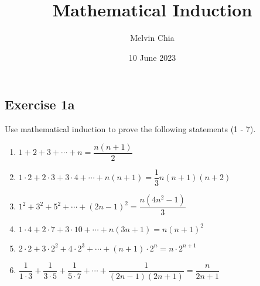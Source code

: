 \documentclass{report}
\title{\Huge{\textbf{Mathematical Induction}}}
\author{Melvin Chia}
\date{10 June 2023}
\begin{document}
\onehalfspacing

\subsection*{Exercise 1a}
Use mathematical induction to prove the following statements (1 - 7).
\begin{enumerate}
    \item $1 + 2 + 3 + \cdots + n = \dfrac{n(n + 1)}{2}$
          \vfill
    \item $1 \cdot 2 + 2 \cdot 3 + 3 \cdot 4 + \cdots + n(n + 1) = \dfrac{1}{3}n(n + 1)(n + 2)$
          \vfill
          \newpage

    \item $1^2 + 3^2 + 5^2 + \cdots + (2n - 1)^2 = \dfrac{n(4n^2 - 1)}{3}$
          \vfill
    \item $1 \cdot 4 + 2 \cdot 7 + 3 \cdot 10 + \cdots + n(3n + 1) = n(n + 1)^2$
          \vfill
          \newpage
    \item $2 \cdot 2 + 3 \cdot 2^2 + 4 \cdot 2^3 + \cdots + (n + 1) \cdot 2^n = n \cdot 2^{n + 1}$
          \vfill
    \item $\dfrac{1}{1 \cdot 3} + \dfrac{1}{3 \cdot 5} + \dfrac{1}{5 \cdot 7} + \cdots + \dfrac{1}{(2n - 1)(2n + 1)} = \dfrac{n}{2n + 1}$
          \vfill
          \newpage
\end{enumerate}

\newpage
\end{document}
